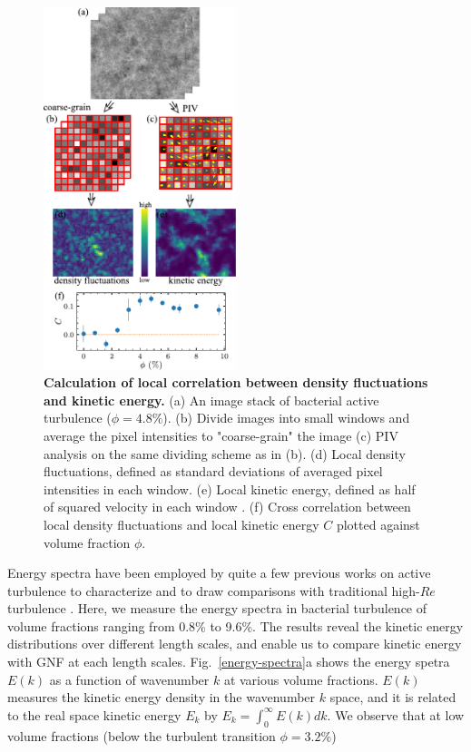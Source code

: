 \documentclass[twocolumn,aps,prl,amsmath,amssymb,longbibliography]{revtex4-2}
\begin{document}
\begin{figure}[ht]
\begin{center}
\includegraphics[width=0.5\textwidth]{figures/fig-5/v3.pdf}
\caption[Concentration dependence of GNF.]
{
\textbf{Calculation of local correlation between density fluctuations and kinetic energy.}
(a) An image stack of bacterial active turbulence ($\phi=4.8\%$).
(b) Divide images into small windows and average the pixel intensities to "coarse-grain" the image
(c) PIV analysis on the same dividing scheme as in (b).
(d) Local density fluctuations, defined as standard deviations of averaged pixel intensities in each window.
(e) Local kinetic energy, defined as half of squared velocity in each window .
(f) Cross correlation between local density fluctuations and local kinetic energy $C$ plotted against volume fraction $\phi$.
}
\label{local-correlation}
\end{center}
\end{figure}

Energy spectra have been employed by quite a few previous works on active turbulence to characterize and to draw comparisons with traditional high-$Re$ turbulence \cite{Ishikawa2011, Dunkel2013b, Bratanov2015, Chatterjee2019, Karani2019, Skultety2020, Peng2020}. Here,
we measure the energy spectra in bacterial turbulence of volume fractions ranging from 0.8\% to 9.6\%. The results reveal the kinetic energy distributions over different length scales, and enable us to compare kinetic energy with GNF at each length scales. Fig.~\ref{energy-spectra}a shows the energy spetra $E(k)$ as a function of wavenumber $k$ at various volume fractions. $E(k)$ measures the kinetic energy density in the wavenumber $k$ space, and it is related to the real space kinetic energy $E_k$ by $E_k = \int_0^\infty E(k)dk$. We observe that at low volume fractions (below the turbulent transition $\phi=3.2\%$)
\end{document}
